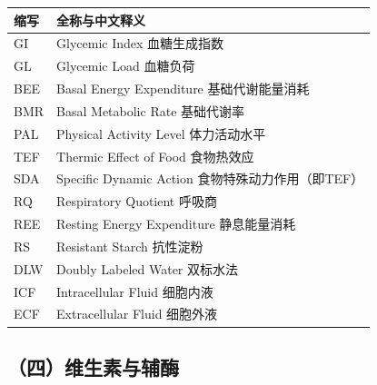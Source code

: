 \begin{table}[H]
\centering
\begin{tabularx}{\textwidth}{lX}
\toprule
\textbf{缩写} & \textbf{全称与中文释义} \\
\midrule
GI & Glycemic Index \hfill 血糖生成指数 \\
GL & Glycemic Load \hfill 血糖负荷 \\
BEE & Basal Energy Expenditure \hfill 基础代谢能量消耗 \\
BMR & Basal Metabolic Rate \hfill 基础代谢率 \\
PAL & Physical Activity Level \hfill 体力活动水平 \\
TEF & Thermic Effect of Food \hfill 食物热效应 \\
SDA & Specific Dynamic Action \hfill 食物特殊动力作用（即TEF） \\
RQ & Respiratory Quotient \hfill 呼吸商 \\
REE & Resting Energy Expenditure \hfill 静息能量消耗 \\
RS & Resistant Starch \hfill 抗性淀粉 \\
DLW & Doubly Labeled Water \hfill 双标水法 \\
ICF & Intracellular Fluid \hfill 细胞内液 \\
ECF & Extracellular Fluid \hfill 细胞外液 \\
\bottomrule
\end{tabularx}
\end{table}

\subsection*{（四）维生素与辅酶}

